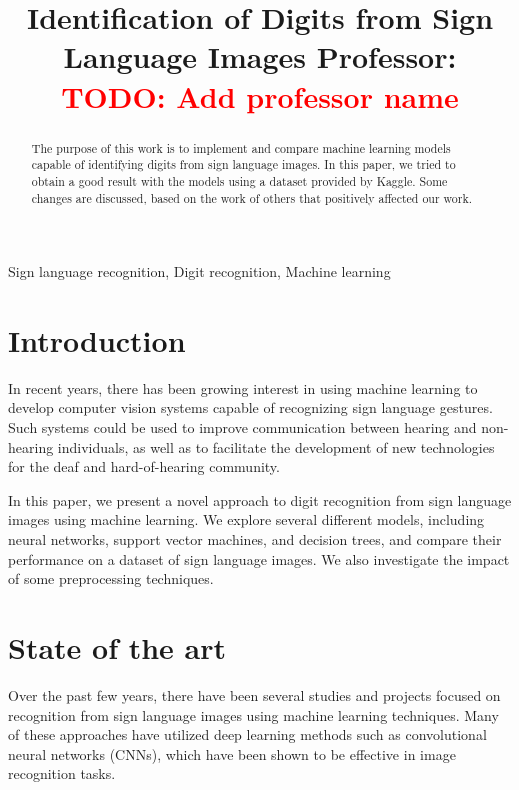 \documentclass[conference]{IEEEtran}
\begin{document}
\title{Identification of Digits from Sign Language Images
Professor: \textcolor{red}{TODO: Add professor name}
}

\author{
\and
{}
}

\maketitle

\begin{abstract}
    The purpose of this work is to implement and
    compare machine learning models capable of identifying digits from sign language images.
    In this paper, we tried to obtain a good result with the models using
    a dataset provided by Kaggle. Some changes are discussed,
    based on the work of others that positively affected our
    work.
\end{abstract}

\begin{IEEEkeywords}
Sign language recognition, Digit recognition, Machine learning
\end{IEEEkeywords}

\section{Introduction}
In recent years, there has been growing interest in using machine learning to develop computer vision systems capable of recognizing sign language gestures. Such systems could be used to improve communication between hearing and non-hearing individuals, as well as to facilitate the development of new technologies for the deaf and hard-of-hearing community.

In this paper, we present a novel approach to digit recognition from sign language images using machine learning. We explore several different models, including neural networks, support vector machines, and decision trees, and compare their performance on a dataset of sign language images. We also investigate the impact of some preprocessing techniques.

\section{State of the art}
Over the past few years, there have been several studies and projects focused on recognition from sign language images using machine learning techniques. Many of these approaches have utilized deep learning methods such as convolutional neural networks (CNNs), which have been shown to be effective in image recognition tasks.
\end{document}

